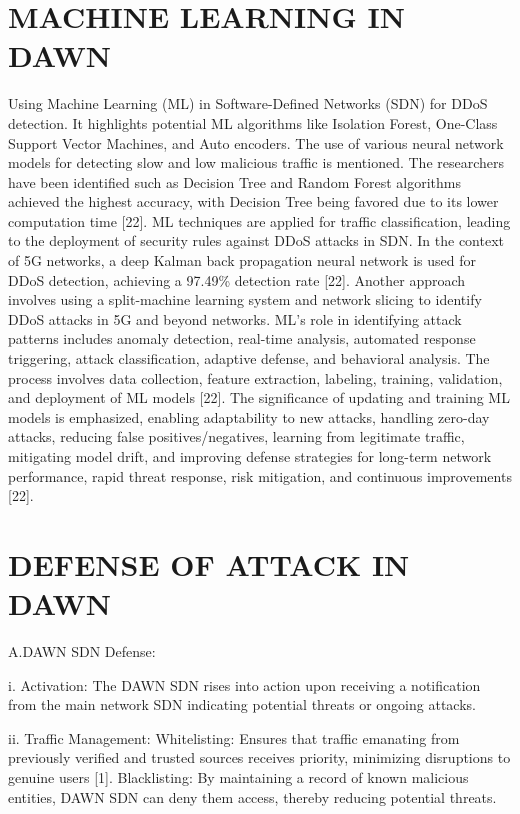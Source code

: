 \documentclass[conference]{IEEEtran}
\begin{document}
\section{MACHINE LEARNING IN DAWN}
Using Machine Learning (ML) in Software-Defined Networks (SDN) for DDoS detection. It highlights potential ML algorithms like Isolation Forest, One-Class Support Vector Machines, and Auto encoders. The use of various neural network models for detecting slow and low malicious traffic is mentioned. The researchers have been identified such as Decision Tree and Random Forest algorithms achieved the highest accuracy, with Decision Tree being favored due to its lower computation time [22]. ML techniques are applied for traffic classification, leading to the deployment of security rules against DDoS attacks in SDN. In the context of 5G networks, a deep Kalman back propagation neural network is used for DDoS detection, achieving a 97.49\% detection rate [22]. Another approach involves using a split-machine learning system and network slicing to identify DDoS attacks in 5G and beyond networks. ML’s role in identifying attack patterns includes anomaly detection, real-time analysis, automated response triggering, attack classification, adaptive defense, and behavioral analysis. The process involves data collection, feature extraction, labeling, training, validation, and deployment of ML models [22]. The significance of updating and training ML models is emphasized, enabling adaptability to new attacks, handling zero-day attacks, reducing false positives/negatives, learning from legitimate traffic, mitigating model drift, and improving defense strategies for long-term network performance, rapid threat response, risk mitigation, and continuous improvements [22].

\section{DEFENSE OF ATTACK IN DAWN}
A.DAWN SDN Defense:

i. Activation:
The DAWN SDN rises into action upon receiving a notification from the main network SDN indicating potential threats or ongoing attacks.

ii. Traffic Management:
Whitelisting: Ensures that traffic emanating from previously verified and trusted sources receives priority, minimizing disruptions to genuine users [1].
Blacklisting: By maintaining a record of known malicious entities, DAWN SDN can deny them access, thereby reducing potential threats.
\end{document}
